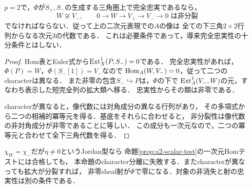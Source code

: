 \begin{proposition}[characterの分離と非分裂性という必要条件]
\label{prop:a2-character-obstructions}
$p=2$で，$\Phi$が$S_+,S_-$の生成する三角圏上で完全忠実であるなら，
\[
W\not\cong V_-,\qquad
0\to W\to V_+\to V_-\to0\text{ は非分裂}
\]
でなければならない．従って上の二次元表現での$A$の像は
全ての下三角$2\times2$行列からなる次元3の代数である．
これは必要条件であって，導来完全忠実性の十分条件とはしない．
\end{proposition}
\begin{proof}
Hom表とEuler式から$\operatorname{Ext}_X^1(P,S_-)=0$である．
完全忠実性があれば，$\Phi(P)=W$，$\Phi(S_-[1])=V_-$なので
$\operatorname{Hom}_A(W,V_-)=0$，従って二つのcharacterは異なる．
また非零の包含$S_-\hookrightarrow P$は，$\Phi$の下で
$\operatorname{Ext}_A^1(V_-,W)$の元，すなわち表示した短完全列の拡大類へ移る．
忠実性からその類は非零である．

characterが異なると，像代数には対角成分の異なる行列があり，
その多項式から二つの相補的冪等元を得る．基底をそれらに合わせると，
非分裂性は像代数の非対角成分が非零であることに等しい．
この成分も一次元なので，二つの冪等元と合わせて全下三角代数を得る．
\end{proof}
\begin{remark}
$\chi_W=\chi_-$だが$\eta\ne0$というJordan型なら
命題\ref{prop:a2-scalar-test}の一次元Homテストには合格しても，
本命題のcharacter分離に失敗する．またcharacterが異なっても拡大が分裂すれば，
非零sheaf射が$\Phi$で零になる．対象の非消失と射の忠実性は別の条件である．
\end{remark}
